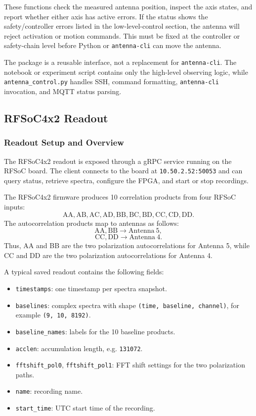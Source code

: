 \documentclass[12pt]{extarticle}
\begin{document}
These functions check the measured antenna position, inspect the axis states,
and report whether either axis has active errors. If the status shows the safety/controller errors listed in the low-level-control section, the antenna will reject activation or motion commands. This must be fixed
at the controller or safety-chain level before Python or \texttt{antenna-cli}
can move the antenna.

The package is a reusable interface, not a replacement for \texttt{antenna-cli}. The notebook or experiment script contains
only the high-level observing logic, while \texttt{antenna\_control.py} handles
SSH, command formatting, \texttt{antenna-cli} invocation, and MQTT status
parsing.


\subsection{RFSoC4x2 Readout}
\subsubsection{Readout Setup and Overview}
The RFSoC4x2 readout is exposed through a gRPC service running on the RFSoC board. The client connects to the board at
\texttt{10.50.2.52:50053} and can query status, retrieve spectra, configure the FPGA, and start or stop recordings.

The RFSoC4x2 firmware produces 10 correlation products from four RFSoC inputs:
\[
\mathrm{AA}, \mathrm{AB}, \mathrm{AC}, \mathrm{AD}, \mathrm{BB}, \mathrm{BC}, \mathrm{BD}, \mathrm{CC}, \mathrm{CD}, \mathrm{DD}.
\]
The autocorrelation products map to antennas as follows:
\[
\mathrm{AA}, \mathrm{BB} \rightarrow \mathrm{Antenna\ 5},
\]
\[
\mathrm{CC}, \mathrm{DD} \rightarrow \mathrm{Antenna\ 4}.
\]
Thus, AA and BB are the two polarization autocorrelations for Antenna 5, while CC and DD are the two polarization autocorrelations for Antenna 4.

A typical saved readout contains the following fields:
\begin{itemize}
    \item \texttt{timestamps}: one timestamp per spectra snapshot.
    \item \texttt{baselines}: complex spectra with shape \texttt{(time, baseline, channel)}, for example \texttt{(9, 10, 8192)}.
    \item \texttt{baseline\_names}: labels for the 10 baseline products.
    \item \texttt{acclen}: accumulation length, e.g. \texttt{131072}.
    \item \texttt{fftshift\_pol0}, \texttt{fftshift\_pol1}: FFT shift settings for the two polarization paths.
    \item \texttt{name}: recording name.
    \item \texttt{start\_time}: UTC start time of the recording.
\end{itemize}
\end{document}
